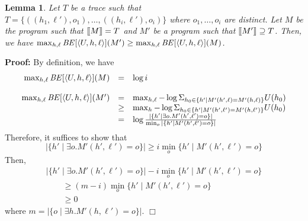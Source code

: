 \documentclass{llncs}
\newtheorem{lemma}[theorem]{Lemma}
\newenvironment{proof}{\noindent\rm{\bf Proof:}}{\hbox{$\Box$}\vspace*{0.2\baselineskip}}
\newcommand{\aset}[1]{\{{#1}\}}
\newcommand{\aseq}[1]{\langle#1\rangle}
\newcommand{\sembrack}[1]{[\hspace*{-1.2pt}[#1]\hspace*{-1.2pt}]}
\begin{document}
\begin{lemma}
\label{lem:bemono}
Let $T$ be a trace such that $T=\aset{((h_1,\ell'),o_1), \dots,
  ((h_i,\ell'),o_i)}$ where $o_1, \dots, o_i$ are distinct.  Let $M$
be the program such that $\sembrack{M} = T$ and $M'$ be a program such
that $\sembrack{M'} \supseteq T$.  Then, we have $\max_{h,\ell} {\it
  BE}[\aseq{U,h,\ell}](M')\ge\max_{h,\ell}{\it
  BE}[\aseq{U,h,\ell}](M)$.
\end{lemma}
\begin{proof}
  By definition, we have 
\[
\begin{array}{rcl}
  \max_{h,\ell} {\it BE}[\aseq{U,h,\ell}](M)&=&\log i\\&&\\

  \max_{h,\ell}{\it BE}[\langle U,h,\ell\rangle](M')&=&\max_{h,\ell}-\log\Sigma_{h_0\in
    \aset{h'\mid M'(h',\ell)=M'(h,\ell)}}U(h_0)\\
&\ge&\max_{h}-\log\Sigma_{h_0\in \aset{h'\mid M'(h',\ell')=M'(h,\ell')}}U(h_0)\\
&=&\log \frac{|\aset{h'\mid
      \exists o. M'(h',\ell')=o}|}{\min_{o}|\aset{h'\mid M'(h',\ell')=o}|}
\end{array}
\]
Therefore, it suffices to show that 
\[|\aset{h'\mid \exists
  o.M'(h',\ell')=o}|\ge i \min_{o}\aset{h'\mid M'(h',\ell')=o}
\]  Then,
\[
\begin{array}{l}
  |\aset{h'\mid \exists o. M'(h',\ell')=o}|- i
  \min_{o}\aset{h'\mid M'(h',\ell')=o}\\
  \qquad\ge (m-i)\min_{o}\aset{h'\mid M'(h',\ell')=o}\\
  \qquad\ge 0
\end{array}
\]where $m=|\aset{o\mid \exists h. M'(h,\ell')=o}|$.
\end{proof}
\end{document}
